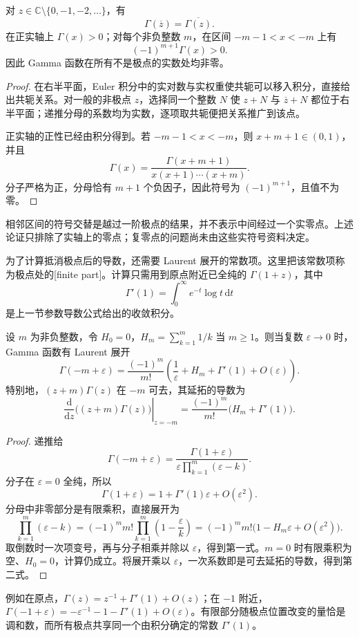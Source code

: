 \begin{proposition}[共轭关系与实轴符号]\label{b3:prop:21-conjugation-sign}
对 \(z\in\mathbb C\setminus\{0,-1,-2,\ldots\}\)，有
\[
 \Gamma(\overline z)=\overline{\Gamma(z)}.
\]
在正实轴上 \(\Gamma(x)>0\)；对每个非负整数 \(m\)，在区间 \(-m-1<x<-m\) 上有
\[
 (-1)^{m+1}\Gamma(x)>0.
\]
因此 Gamma 函数在所有不是极点的实数处均非零。
\end{proposition}
\begin{proof}
在右半平面，Euler 积分中的实对数与实权重使共轭可以移入积分，直接给出共轭关系。对一般的非极点 \(z\)，选择同一个整数 \(N\) 使 \(z+N\) 与 \(\overline z+N\) 都位于右半平面；递推分母的系数均为实数，逐项取共轭便把关系推广到该点。

正实轴的正性已经由积分得到。若 \(-m-1<x<-m\)，则 \(x+m+1\in(0,1)\)，并且
\[
 \Gamma(x)=\frac{\Gamma(x+m+1)}{x(x+1)\cdots(x+m)}.
\]
分子严格为正，分母恰有 \(m+1\) 个负因子，因此符号为 \((-1)^{m+1}\)，且值不为零。
\end{proof}
相邻区间的符号交替是越过一阶极点的结果，并不表示中间经过一个实零点。上述论证只排除了实轴上的零点；复零点的问题尚未由这些实符号资料决定。

\ProseParagraphBreak

为了计算抵消极点后的导数，还需要 Laurent 展开的常数项。这里把该常数项称为极点处的[finite part]。计算只需用到原点附近已全纯的 \(\Gamma(1+z)\)，其中
\[
 \Gamma'(1)=\int_0^\infty e^{-t}\log t\,\mathrm{d}t
\]
是上一节参数导数公式给出的收敛积分。

\begin{proposition}[极点的有限部分]\label{b3:prop:21-finite-part}
设 \(m\) 为非负整数，令 \(H_0=0\)，\(H_m=\sum_{k=1}^m1/k\) 当 \(m\ge1\)。则当复数 \(\varepsilon\to0\) 时，Gamma 函数有 Laurent 展开
\[
 \Gamma(-m+\varepsilon)
 =\frac{(-1)^m}{m!}
  \left(\frac1\varepsilon+H_m+\Gamma'(1)+O(\varepsilon)\right).
\]
特别地，\((z+m)\Gamma(z)\) 在 \(-m\) 可去，其延拓的导数为
\[
 \left.\frac{\mathrm{d}}{\mathrm{d}z}\bigl((z+m)\Gamma(z)\bigr)\right|_{z=-m}
 =\frac{(-1)^m}{m!}\bigl(H_m+\Gamma'(1)\bigr).
\]
\end{proposition}
\begin{proof}
递推给
\[
 \Gamma(-m+\varepsilon)
 =\frac{\Gamma(1+\varepsilon)}
 {\varepsilon\prod_{k=1}^m(\varepsilon-k)}.
\]
分子在 \(\varepsilon=0\) 全纯，所以
\[
 \Gamma(1+\varepsilon)=1+\Gamma'(1)\varepsilon+O(\varepsilon^2).
\]
分母中非零部分是有限乘积，直接展开为
\[
 \prod_{k=1}^m(\varepsilon-k)
 =(-1)^m m!\prod_{k=1}^m\left(1-\frac\varepsilon k\right)
 =(-1)^m m!\bigl(1-H_m\varepsilon+O(\varepsilon^2)\bigr).
\]
取倒数时一次项变号，再与分子相乘并除以 \(\varepsilon\)，得到第一式。\(m=0\) 时有限乘积为空、\(H_0=0\)，计算仍成立。将展开乘以 \(\varepsilon\)，一次系数即是可去延拓的导数，得到第二式。
\end{proof}
例如在原点，\(\Gamma(z)=z^{-1}+\Gamma'(1)+O(z)\)；在 \(-1\) 附近，\(\Gamma(-1+\varepsilon)=-\varepsilon^{-1}-1-\Gamma'(1)+O(\varepsilon)\)。有限部分随极点位置改变的量恰是调和数，而所有极点共享同一个由积分确定的常数 \(\Gamma'(1)\)。

